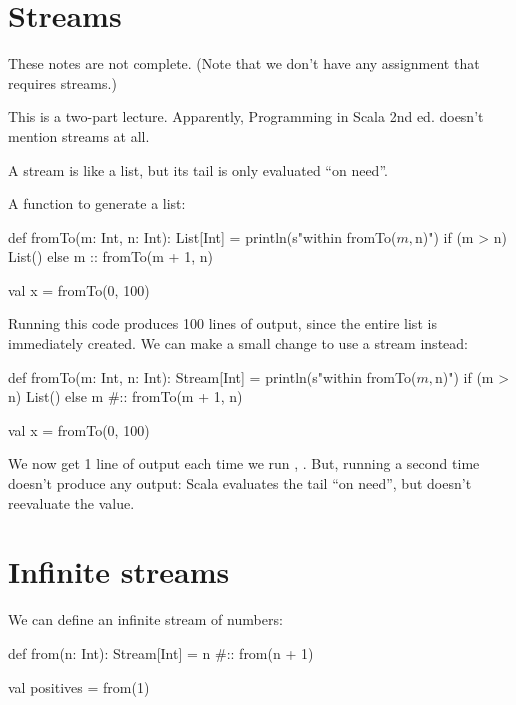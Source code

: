 \newlecture

\section{Streams}

\begin{instructor}
These notes are not complete. (Note that we don't have any assignment that requires streams.)

This is a two-part lecture.
Apparently, Programming in Scala 2nd ed. doesn't mention streams at all. 
\end{instructor}

A stream is like a list, but its tail is only evaluated ``on need''.

A function to generate a list:

\begin{scalacode}
def fromTo(m: Int, n: Int): List[Int] = {
  println(s"within fromTo($m, $n)")
  if (m > n) {
    List()
  }
  else {
    m :: fromTo(m + 1, n)
  }
}

val x = fromTo(0, 100)
\end{scalacode}

Running this code produces 100 lines of output, since the entire list is
immediately created. We can make a small change to use a stream instead:

\begin{scalacode}
def fromTo(m: Int, n: Int): Stream[Int] = {
  println(s"within fromTo($m, $n)")
  if (m > n) {
    List()
  }
  else {
    m #:: fromTo(m + 1, n)
  }
}

val x = fromTo(0, 100)
\end{scalacode}

We now get 1 line of output each time we run , .
But, running  a second time doesn't produce any output: Scala evaluates
the tail ``on need'', but doesn't reevaluate the value.

\section{Infinite streams}

We can define an infinite stream of numbers:

\begin{scalacode}
def from(n: Int): Stream[Int] = n #:: from(n + 1)

val positives = from(1)
\end{scalacode}

